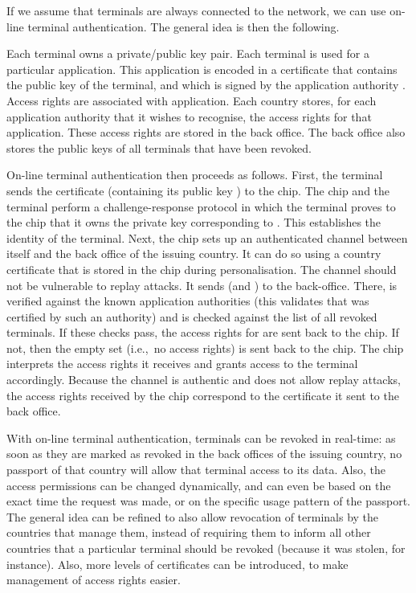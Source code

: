 \documentclass[runningheads,envcountsame,envcountsect,oribibl]{llncs}
\newcommand{\ie}{{i.e.},\ }		\newcommand{\eg}{{e.g.},\ }		\newcommand{\etal}{\textit{et al.}~}
\begin{document}
If we assume that terminals are always connected to the network, we can use
on-line terminal authentication. The general idea is then the following.

Each terminal owns a private/public key pair. Each terminal is used for a
particular application. This application is encoded in a certificate 
that contains the public key  of the terminal, and which is signed by
the application authority . Access rights are associated with
application. Each country stores, for each application authority that it wishes
to recognise, the access rights for that application. These access rights are
stored in the back office. The back office also stores the public keys of all
terminals that have been revoked.

On-line terminal authentication then proceeds as follows.  First, the terminal
sends the certificate  (containing its public key ) to the
chip.  The 
chip and the terminal perform a challenge-response protocol in which the
terminal proves to the chip that it owns the private key corresponding to
. This establishes the identity of the terminal.  Next, the chip sets
up an authenticated channel between itself and the back office of the issuing
country. It can do so using a country certificate that is stored in the chip
during personalisation. The channel should not be vulnerable to replay attacks.
It sends  (and ) 
to the back-office. There,  is verified against the known application
authorities (this validates that  was certified by such
an authority) and
 is checked against the list of all revoked
terminals. If these checks pass, the access rights for  are sent back to
the chip. If not, then the empty set (\ie no access rights) is sent back to
the chip.
The chip interprets the access rights it receives and grants access to the
terminal accordingly. Because the channel is authentic and does not allow
replay attacks, the access rights received by the chip correspond to the
certificate it sent to the back office.


With on-line terminal authentication, terminals can be revoked in real-time: as
soon as they are marked as revoked in the back offices of the issuing country,
no passport of that country will allow that terminal access to its data.
Also, the access permissions can be changed dynamically, and can even be based
on the exact time the request was made, or on the specific usage pattern of the
passport.
The general idea can be refined to also allow revocation of terminals by the
countries that manage them, instead of requiring them to inform all other
countries that a particular terminal should be revoked (because it was stolen,
for instance).
Also, more levels of certificates can be introduced, to make management of 
access rights easier. 
\end{document}

